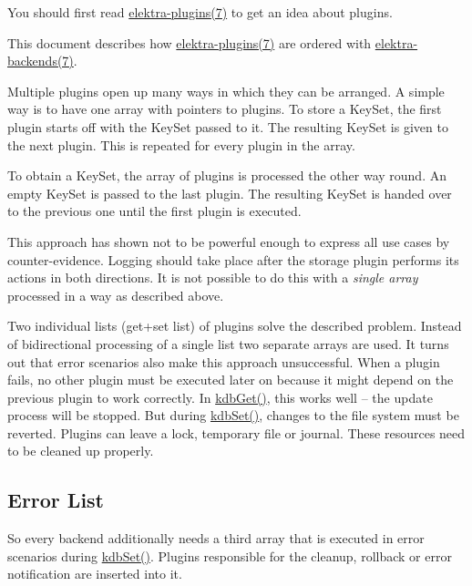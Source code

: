 You should first read \hyperlink{md_src_plugins_README_src_plugins_README_md}{elektra-\/plugins(7)} to get an idea about plugins.

This document describes how \hyperlink{md_src_plugins_README_src_plugins_README_md}{elektra-\/plugins(7)} are ordered with \hyperlink{md_doc_help_elektra-backends_doc_help_elektra-backends_md}{elektra-\/backends(7)}.

Multiple plugins open up many ways in which they can be arranged. A simple way is to have one array with pointers to plugins. To store a {\ttfamily Key\+Set}, the first plugin starts off with the {\ttfamily Key\+Set} passed to it. The resulting {\ttfamily Key\+Set} is given to the next plugin. This is repeated for every plugin in the array.

To obtain a {\ttfamily Key\+Set}, the array of plugins is processed the other way round. An empty {\ttfamily Key\+Set} is passed to the last plugin. The resulting {\ttfamily Key\+Set} is handed over to the previous one until the first plugin is executed.

This approach has shown not to be powerful enough to express all use cases by counter-\/evidence. Logging should take place after the storage plugin performs its actions in both directions. It is not possible to do this with a {\itshape single array} processed in a way as described above.

Two individual lists (get+set list) of plugins solve the described problem. Instead of bidirectional processing of a single list two separate arrays are used. It turns out that error scenarios also make this approach unsuccessful. When a plugin fails, no other plugin must be executed later on because it might depend on the previous plugin to work correctly. In {\ttfamily \hyperlink{group__kdb_ga28e385fd9cb7ccfe0b2f1ed2f62453a1}{kdb\+Get()}}, this works well -- the update process will be stopped. But during {\ttfamily \hyperlink{group__kdb_ga11436b058408f83d303ca5e996832bcf}{kdb\+Set()}}, changes to the file system must be reverted. Plugins can leave a lock, temporary file or journal. These resources need to be cleaned up properly.

\subsection*{Error List}

So every backend additionally needs a third array that is executed in error scenarios during {\ttfamily \hyperlink{group__kdb_ga11436b058408f83d303ca5e996832bcf}{kdb\+Set()}}. Plugins responsible for the cleanup, rollback or error notification are inserted into it.

